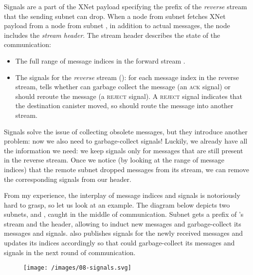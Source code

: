 \documentclass{article}
\begin{document}
Signals are a part of the XNet payload specifying the prefix of the \emph{reverse} stream that the sending subnet can drop.
When a node from subnet  fetches XNet payload from a node from subnet , in addition to actual messages, the  node includes the \emph{stream header}.
The stream header describes the state of the  communication:

\begin{itemize}
  \item
    The full range of message indices in the forward stream .
  \item
    The signals for the \emph{reverse} stream (): for each message index in the reverse stream,  tells whether  can garbage collect the message (an \textsc{ack} signal) or should reroute the message (a \textsc{reject} signal).
    A \textsc{reject} signal indicates that the destination canister moved, so  should route the message into another stream.
\end{itemize}

Signals solve the issue of collecting obsolete messages, but they introduce another problem: now we also need to garbage-collect signals!
Luckily, we already have all the information we need: we keep signals only for messages that are still present in the reverse stream.
Once we notice (by looking at the range of message indices) that the remote subnet dropped messages from its stream, we can remove the corresponding signals from our header.

From my experience, the interplay of message indices and signals is notoriously hard to grasp, so let us look at an example.
The diagram below depicts two subnets,  and , caught in the middle of communication.
Subnet  gets a prefix of 's stream and the header, allowing  to induct new messages and garbage-collect its messages and signals.
 also publishes signals for the newly received messages and updates its indices accordingly so that  could garbage-collect its messages and signals in the next round of communication.

\begin{figure}[grayscale-diagram]
  \texttt{[image: /images/08-signals.svg]}
\end{figure}
\end{document}
